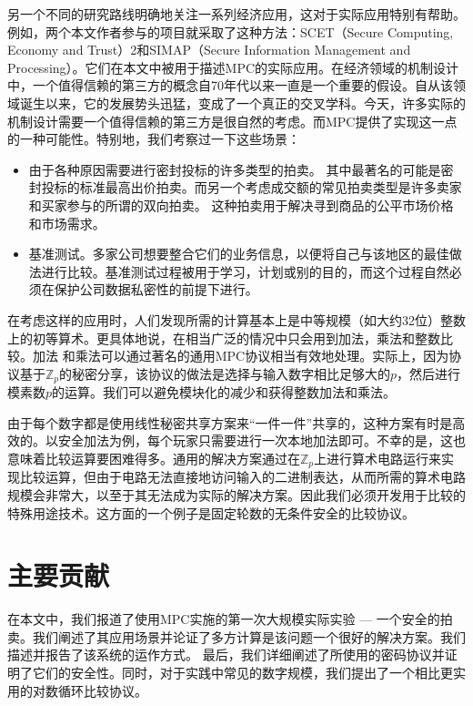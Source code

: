 另一个不同的研究路线明确地关注一系列经济应用，这对于实际应用特别有帮助。例如，两个本文作者参与的项目就采取了这种方法：SCET（Secure Computing, Economy and Trust）2和SIMAP（Secure Information Management and Processing）。它们在本文中被用于描述MPC的实际应用。在经济领域的机制设计中，一个值得信赖的第三方的概念自70年代以来一直是一个重要的假设。自从该领域诞生以来，它的发展势头迅猛，变成了一个真正的交叉学科。今天，许多实际的机制设计需要一个值得信赖的第三方是很自然的考虑。而MPC提供了实现这一点的一种可能性。特别地，我们考察过一下这些场景：
\begin{itemize}
	\item 由于各种原因需要进行密封投标的许多类型的拍卖。 其中最著名的可能是密封投标的标准最高出价拍卖。而另一个考虑成交额的常见拍卖类型是许多卖家和买家参与的所谓的双向拍卖。 这种拍卖用于解决寻到商品的公平市场价格和市场需求。
	\item 基准测试。多家公司想要整合它们的业务信息，以便将自己与该地区的最佳做法进行比较。基准测试过程被用于学习，计划或别的目的，而这个过程自然必须在保护公司数据私密性的前提下进行。
\end{itemize}

在考虑这样的应用时，人们发现所需的计算基本上是中等规模（如大约32位）整数上的初等算术。更具体地说，在相当广泛的情况中只会用到加法，乘法和整数比较。加法
和乘法可以通过著名的通用MPC协议相当有效地处理。实际上，因为协议基于$\mathbb{Z}_p$的秘密分享，该协议的做法是选择与输入数字相比足够大的$p$，然后进行模素数$p$的运算。我们可以避免模块化的减少和获得整数加法和乘法。

由于每个数字都是使用线性秘密共享方案来“一件一件”共享的，这种方案有时是高效的。以安全加法为例，每个玩家只需要进行一次本地加法即可。不幸的是，这也意味着比较运算要困难得多。通用的解决方案通过在$\mathbb{Z}_p$上进行算术电路运行来实现比较运算，但由于电路无法直接地访问输入的二进制表达，从而所需的算术电路规模会非常大，以至于其无法成为实际的解决方案。因此我们必须开发用于比较的特殊用途技术。这方面的一个例子是固定轮数的无条件安全的比较协议。

\section{主要贡献}
在本文中，我们报道了使用MPC实施的第一次大规模实际实验 --- 一个安全的拍卖。我们阐述了其应用场景并论证了多方计算是该问题一个很好的解决方案。我们描述并报告了该系统的运作方式。 最后，我们详细阐述了所使用的密码协议并证明了它们的安全性。同时，对于实践中常见的数字规模，我们提出了一个相比更实用的对数循环比较协议。

